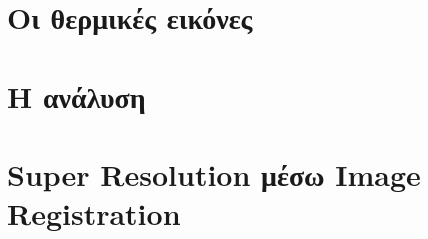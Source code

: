 \documentclass[a4paper,11pt,twoside]{book}
\author{\me}
\begin{document}
\setcounter{page}{3}



\clearemptydoublepage



\clearemptydoublepage



\clearemptydoublepage



\clearemptydoublepage



\clearemptydoublepage

\pagestyle{fancy}

\tableofcontents
\clearemptydoublepage

\setcounter{page}{1}


\clearemptydoublepage

\chapter{Οι θερμικές εικόνες}\label{ch:chap1}

\clearemptydoublepage

\chapter{Η ανάλυση}\label{ch:chap2}

\clearemptydoublepage

\chapter{Super Resolution μέσω Image Registration}\label{ch:chap3}

\clearemptydoublepage


\end{document}
